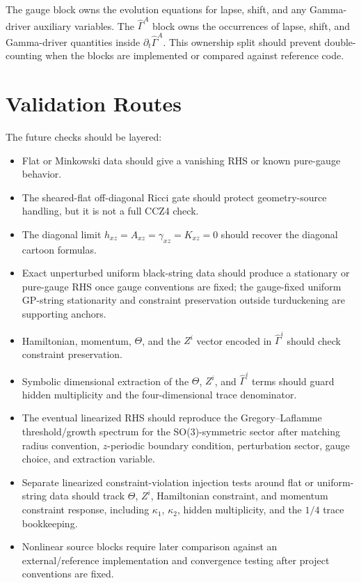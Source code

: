 \documentclass[11pt]{article}
\begin{document}
The gauge block owns the evolution equations for lapse, shift, and any
Gamma-driver auxiliary variables. The \(\hat{\Gamma}^A\) block owns the
occurrences of lapse, shift, and Gamma-driver quantities inside
\(\partial_t\hat{\Gamma}^A\). This ownership split should prevent
double-counting when the blocks are implemented or compared against reference
code.

\section{Validation Routes}

The future checks should be layered:
\begin{itemize}
  \item Flat or Minkowski data should give a vanishing RHS or known pure-gauge
  behavior.
  \item The sheared-flat off-diagonal Ricci gate should protect geometry-source
  handling, but it is not a full CCZ4 check.
  \item The diagonal limit \(h_{xz}=A_{xz}=\gamma_{xz}=K_{xz}=0\) should recover
  the diagonal cartoon formulas.
  \item Exact unperturbed uniform black-string data should produce a stationary
  or pure-gauge RHS once gauge conventions are fixed; the gauge-fixed uniform
  GP-string stationarity and constraint preservation outside turduckening are
  supporting anchors.
  \item Hamiltonian, momentum, \(\Theta\), and the \(Z^i\) vector encoded in
  \(\hat{\Gamma}^i\) should check constraint preservation.
  \item Symbolic dimensional extraction of the \(\Theta\), \(Z^i\), and
  \(\hat{\Gamma}^i\) terms should guard hidden multiplicity and the
  four-dimensional trace denominator.
  \item The eventual linearized RHS should reproduce the Gregory--Laflamme
  threshold/growth spectrum for the SO(3)-symmetric sector after matching
  radius convention, \(z\)-periodic boundary condition, perturbation sector,
  gauge choice, and extraction variable.
  \item Separate linearized constraint-violation injection tests around flat or
  uniform-string data should track \(\Theta\), \(Z^i\), Hamiltonian constraint,
  and momentum constraint response, including \(\kappa_1\), \(\kappa_2\),
  hidden multiplicity, and the \(1/4\) trace bookkeeping.
  \item Nonlinear source blocks require later comparison against an
  external/reference implementation and convergence testing after project
  conventions are fixed.
\end{itemize}
\end{document}
